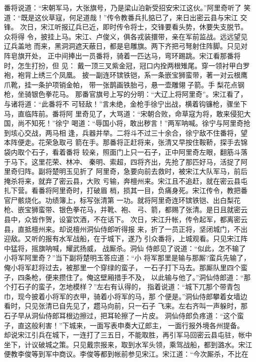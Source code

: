 番将说道：“宋朝军马，大张旗号，乃是梁山泊新受招安宋江这伙。”阿里奇听了
笑道：“既是这伙草寇，何足道哉！”传令教番兵扎掂已了，来日出密云县与宋江
交锋。
次日，宋江听报辽兵已近，即时传令将士，交锋要看头势，休要失支脱节。众将得
令，披挂上马。宋江、卢俊义，俱各戎装擐带，亲在军前监战。远远望见辽兵盖地
而来，黑洞洞遮天蔽日，都是皂雕旗。两下齐把弓弩射住阵脚。只见对阵皂旗开处，
正中间捧出一员番将，骑着一匹达马，弯环踢跳。宋江看那番将时，怎生打扮，但
见：
戴一顶三叉紫金冠，冠口内拴两根雉尾。穿一领衬甲白罗袍，袍背上绣三个凤凰。
披一副连环镔铁铠，系一条嵌宝狮蛮带，著一对云根鹰爪靴，挂一条护项销金帕，
带一张鹊画铁胎弓，悬一壶雕翎子箭。手梨花点钢枪，坐骑银色拳花马。
那番官旗号上写的分明：“大辽上将阿里奇”。宋江看了，与诸将道：“此番将不
可轻敌！”言未绝，金枪手徐宁出战，横着钩镰枪，骤坐下马，直临阵前。番将阿
里奇见了，大骂道：“宋朝合败，命草寇为将，敢来侵犯大国，尚不知死！”徐宁
喝道：“辱国小将，敢出秽言！”两军呐喊。徐宁与阿里奇抢到垓心交战，两马相
逢，兵器并举。二将斗不过三十余合，徐宁敌不住番将，望本阵便走。花荣急取弓
箭在手。那番将正赶将来，张清又早按住鞍鞒，探手去锦袋内取个石子，看着番将
较亲，照面门上只一石子，正中阿里奇左眼，翻筋斗落于马下。这里花荣、林冲、
秦明、索超，四将齐出，先抢了那匹好马，活捉了阿里奇归阵。副将楚明玉见折了
阿里奇，急要向前去救时，被宋江大队军马，前后掩杀将来，就弃了密云县，大败
亏输，奔檀州来。宋江且不追赶，就在密云县屯扎下营。看番将阿里奇时，打破眉
梢，损其一目，负痛身死。宋江传令，教把番官尸骸烧化。功绩簿上，标写张清第
一功。就将阿里奇连环镔铁铠、出白梨花枪、嵌宝狮蛮带、银色拳花马，并靴、袍、
弓、箭，都赐了张清。是日且就密云县中，众皆作贺，设宴饮酒，不在话下。
次日，宋江升帐，传令起军，都离密云县，直抵檀州来。却说檀州洞仙侍郎听得报
来，折了一员正将，坚闭城门，不出迎敌。又听的报有水军战船，在于城下，遂乃
引众番将，上城观看。只见宋江阵中猛将，摇旗呐喊，耀武扬威，战厮杀。洞仙
侍郎见了说道：“似此，怎不输了小将军阿里奇？”当下副将楚明玉答应道：“小
将军那里是输与那厮?蛮兵先输了，俺小将军赶将过去，被那里一个穿绿的蛮子，
一石子打下马去。那厮队里四个蛮子，四条枪，便来攒住了。俺这壁厢措手不及，
以此输与他了。”洞仙侍郎道：“那个打石子的蛮子，怎地模样？”左右有认得的，
指着说道：“城下兀那个带青包巾，现今披着小将军的衣甲，骑着小将军的马，那
个便是。”洞仙侍郎攀着女墙边看时，只见张清已自先见了，趱马向前，只一石子
飞来。左右齐叫一声躲时，那石子早从洞仙侍郎耳根边擦过，把耳轮擦了一片皮。
洞仙侍郎负疼道：“这个蛮子，直这般利害！”下城来，一面写表申奏大辽郎主，
一面行报外境各州提备。
却说宋江引兵在城下，一连打了三五日，不能取胜，再引军马回密云县屯驻，帐中
坐下，计议破城之策。只见戴宗报来，取到水军头领，乘驾战船，都到潞水。宋江
便教李俊等到军中商议。李俊等都到帐前参见宋江。宋江道：“今次厮杀，不比在
